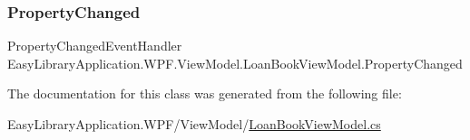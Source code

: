 \subsubsection{\texorpdfstring{Property\+Changed}{PropertyChanged}}
{\footnotesize\ttfamily Property\+Changed\+Event\+Handler Easy\+Library\+Application.\+W\+P\+F.\+View\+Model.\+Loan\+Book\+View\+Model.\+Property\+Changed}



The documentation for this class was generated from the following file\+:\begin{DoxyCompactItemize}
\item 
Easy\+Library\+Application.\+W\+P\+F/\+View\+Model/\mbox{\hyperlink{_loan_book_view_model_8cs}{Loan\+Book\+View\+Model.\+cs}}\end{DoxyCompactItemize}
